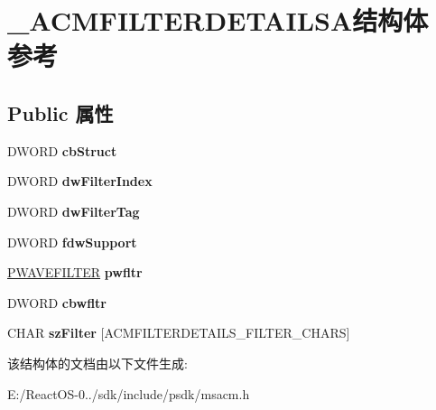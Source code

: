 \hypertarget{struct___a_c_m_f_i_l_t_e_r_d_e_t_a_i_l_s_a}{}\section{\+\_\+\+A\+C\+M\+F\+I\+L\+T\+E\+R\+D\+E\+T\+A\+I\+L\+S\+A结构体 参考}
\label{struct___a_c_m_f_i_l_t_e_r_d_e_t_a_i_l_s_a}
\subsection*{Public 属性}
\begin{DoxyCompactItemize}
\item 
\mbox{\label{struct___a_c_m_f_i_l_t_e_r_d_e_t_a_i_l_s_a_af7c3a734e954253df1d87c1a01e75e13}} 
D\+W\+O\+RD {\bfseries cb\+Struct}
\item 
\mbox{\label{struct___a_c_m_f_i_l_t_e_r_d_e_t_a_i_l_s_a_a359e74216b78768b5dac0e2f10b59719}} 
D\+W\+O\+RD {\bfseries dw\+Filter\+Index}
\item 
\mbox{\label{struct___a_c_m_f_i_l_t_e_r_d_e_t_a_i_l_s_a_a14aa075d896a42354b978f3d30acad34}} 
D\+W\+O\+RD {\bfseries dw\+Filter\+Tag}
\item 
\mbox{\label{struct___a_c_m_f_i_l_t_e_r_d_e_t_a_i_l_s_a_aee6b444daad613b226d371af68e7744f}} 
D\+W\+O\+RD {\bfseries fdw\+Support}
\item 
\mbox{\label{struct___a_c_m_f_i_l_t_e_r_d_e_t_a_i_l_s_a_a2c5141be34176a56a29e218261edfed4}} 
\hyperlink{struct___w_a_v_e_f_i_l_t_e_r}{P\+W\+A\+V\+E\+F\+I\+L\+T\+ER} {\bfseries pwfltr}
\item 
\mbox{\label{struct___a_c_m_f_i_l_t_e_r_d_e_t_a_i_l_s_a_af7ae5c0c5f423f78d1b6985685e97a6e}} 
D\+W\+O\+RD {\bfseries cbwfltr}
\item 
\mbox{\label{struct___a_c_m_f_i_l_t_e_r_d_e_t_a_i_l_s_a_a2d40d9643bb92151f95e4e4b7b73e0b2}} 
C\+H\+AR {\bfseries sz\+Filter} \mbox{[}A\+C\+M\+F\+I\+L\+T\+E\+R\+D\+E\+T\+A\+I\+L\+S\+\_\+\+F\+I\+L\+T\+E\+R\+\_\+\+C\+H\+A\+RS\mbox{]}
\end{DoxyCompactItemize}


该结构体的文档由以下文件生成\+:\begin{DoxyCompactItemize}
\item 
E\+:/\+React\+O\+S-\/0../sdk/include/psdk/msacm.\+h\end{DoxyCompactItemize}
